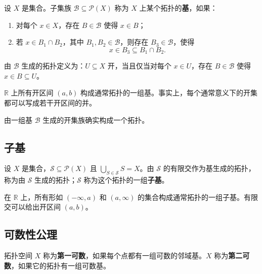 \begin{definition}[基]
设 $X$ 是集合。子集族 $\mathcal{B}\subseteq\mathcal{P}(X)$ 称为 $X$ 上某个拓扑的\textbf{基}，如果：
\begin{enumerate}
    \item 对每个 $x\in X$，存在 $B\in\mathcal{B}$ 使得 $x\in B$；
    \item 若 $x\in B_1\cap B_2$，其中 $B_1,B_2\in\mathcal{B}$，则存在 $B_3\in\mathcal{B}$，使得
    \[
        x\in B_3\subseteq B_1\cap B_2.
    \]
\end{enumerate}
由 $\mathcal{B}$ 生成的拓扑定义为：$U\subseteq X$ 开，当且仅当对每个 $x\in U$，存在 $B\in\mathcal{B}$ 使得 $x\in B\subseteq U$。
\end{definition}

\begin{example}
$\mathbb{R}$ 上所有开区间 $(a,b)$ 构成通常拓扑的一组基。事实上，每个通常意义下的开集都可以写成若干开区间的并。
\end{example}

\begin{proposition}
由一组基 $\mathcal{B}$ 生成的开集族确实构成一个拓扑。
\end{proposition}

\subsection{子基}

\begin{definition}[子基]
设 $X$ 是集合，$\mathcal{S}\subseteq\mathcal{P}(X)$ 且 $\bigcup_{S\in\mathcal{S}}S=X$。由 $\mathcal{S}$ 的有限交作为基生成的拓扑，称为由 $\mathcal{S}$ 生成的拓扑；$\mathcal{S}$ 称为这个拓扑的一组\textbf{子基}。
\end{definition}

\begin{example}
在 $\mathbb{R}$ 上，所有形如 $(-\infty,a)$ 和 $(a,\infty)$ 的集合构成通常拓扑的一组子基。有限交可以给出开区间 $(a,b)$。
\end{example}

\subsection{可数性公理}

\begin{definition}[第一可数与第二可数]
拓扑空间 $X$ 称为\textbf{第一可数}，如果每个点都有一组可数的邻域基。$X$ 称为\textbf{第二可数}，如果它的拓扑有一组可数基。
\end{definition}

